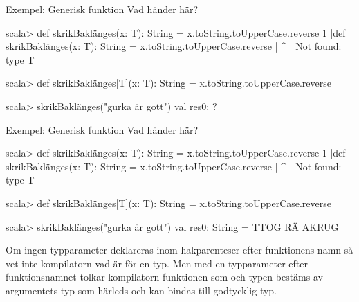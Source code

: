 \begin{Slide}{Exempel: Generisk funktion}
Vad händer här?
\begin{REPL}

scala> def skrikBaklänges(x: T): String = x.toString.toUpperCase.reverse
1 |def skrikBaklänges(x: T): String = x.toString.toUpperCase.reverse
  |                      ^
  |                      Not found: type T

scala> def skrikBaklänges[T](x: T): String = x.toString.toUpperCase.reverse

scala> skrikBaklänges("gurka är gott")
val res0: ?
\end{REPL}
\end{Slide}
\fi

\begin{Slide}{Exempel: Generisk funktion}
Vad händer här?
\begin{REPL}

scala> def skrikBaklänges(x: T): String = x.toString.toUpperCase.reverse
1 |def skrikBaklänges(x: T): String = x.toString.toUpperCase.reverse
  |                      ^
  |                      Not found: type T

scala> def skrikBaklänges[T](x: T): String = x.toString.toUpperCase.reverse

scala> skrikBaklänges("gurka är gott")
val res0: String = TTOG RÄ AKRUG
\end{REPL}
\SlideFontSmall
Om ingen typparameter deklareras inom hakparenteser efter funktionens namn så vet inte kompilatorn vad  är för en typ. Men med en typparameter \code{[T]} efter funktionsnamnet tolkar kompilatorn funktionen som  och typen  bestäms av argumentets typ som härleds  och  kan bindas till godtycklig typ.
\end{Slide}


